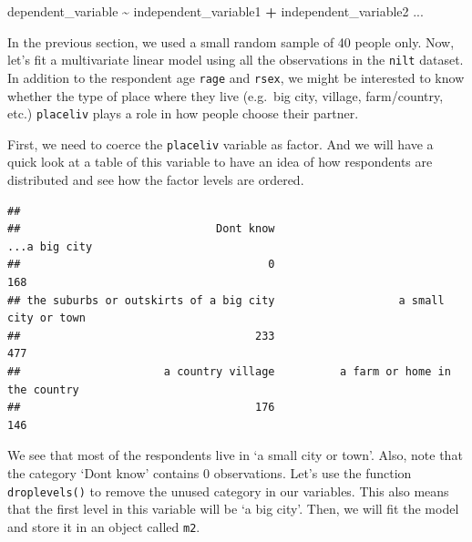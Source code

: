 \documentclass[
]{book}
\newenvironment{Shaded}{\begin{snugshade}}{\end{snugshade}}
\newcommand{\AttributeTok}[1]{\textcolor[rgb]{0.13,0.29,0.53}{#1}}
\newcommand{\CommentTok}[1]{\textcolor[rgb]{0.56,0.35,0.01}{\textit{#1}}}
\newcommand{\FunctionTok}[1]{\textcolor[rgb]{0.13,0.29,0.53}{\textbf{#1}}}
\newcommand{\NormalTok}[1]{#1}
\newcommand{\OtherTok}[1]{\textcolor[rgb]{0.56,0.35,0.01}{#1}}
\newcommand{\SpecialCharTok}[1]{\textcolor[rgb]{0.81,0.36,0.00}{\textbf{#1}}}
\begin{document}
\begin{Shaded}
\begin{Highlighting}[]
\NormalTok{dependent\_variable }\SpecialCharTok{\textasciitilde{}}\NormalTok{ independent\_variable1 }\SpecialCharTok{+}\NormalTok{ independent\_variable2 ...}
\end{Highlighting}
\end{Shaded}

In the previous section, we used a small random sample of 40 people only. Now, let's fit a multivariate linear model using all the observations in the \texttt{nilt} dataset. In addition to the respondent age \texttt{rage} and \texttt{rsex}, we might be interested to know whether the type of place where they live (e.g.~big city, village, farm/country, etc.) \texttt{placeliv} plays a role in how people choose their partner.

First, we need to coerce the \texttt{placeliv} variable as factor. And we will have a quick look at a table of this variable to have an idea of how respondents are distributed and see how the factor levels are ordered.

\begin{Shaded}
\end{Shaded}

\begin{verbatim}
## 
##                              Dont know                          ...a big city 
##                                      0                                    168 
## the suburbs or outskirts of a big city                   a small city or town 
##                                    233                                    477 
##                      a country village          a farm or home in the country 
##                                    176                                    146
\end{verbatim}

We see that most of the respondents live in `a small city or town'. Also, note that the category `Dont know' contains 0 observations. Let's use the function \texttt{droplevels()} to remove the unused category in our variables. This also means that the first level in this variable will be `a big city'. Then, we will fit the model and store it in an object called \texttt{m2}.
\end{document}
